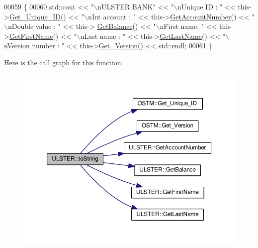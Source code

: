 \begin{DoxyCode}
00059 \{
00060    std::cout << \textcolor{stringliteral}{"\(\backslash\)nULSTER BANK"} << \textcolor{stringliteral}{"\(\backslash\)nUnique ID : "} << this->\hyperlink{class_o_s_t_m_a5a01a8b98d16b1d1904ecf9356e7b71d_a5a01a8b98d16b1d1904ecf9356e7b71d}{Get\_Unique\_ID}() << \textcolor{stringliteral}{"\(\backslash\)nInt account
       : "} << this->\hyperlink{class_u_l_s_t_e_r_a1ad672ae865a9f559bf4d3c33c243d63_a1ad672ae865a9f559bf4d3c33c243d63}{GetAccountNumber}() << \textcolor{stringliteral}{"\(\backslash\)nDouble value : "} << this->
      \hyperlink{class_u_l_s_t_e_r_ae70da9686ac038862900182a984e56eb_ae70da9686ac038862900182a984e56eb}{GetBalance}() << \textcolor{stringliteral}{"\(\backslash\)nFirst name: "} << this->\hyperlink{class_u_l_s_t_e_r_a85ee4e42d9b309608d8dfbedac65ff27_a85ee4e42d9b309608d8dfbedac65ff27}{GetFirstName}() << \textcolor{stringliteral}{"\(\backslash\)nLast name : "} << 
      this->\hyperlink{class_u_l_s_t_e_r_a9320b012bccda4ebf6b41c9ed972743c_a9320b012bccda4ebf6b41c9ed972743c}{GetLastName}()  << \textcolor{stringliteral}{"\(\backslash\)nVersion number : "} << this->\hyperlink{class_o_s_t_m_a1f1db9d482f22c8e7caa17dfb340626b_a1f1db9d482f22c8e7caa17dfb340626b}{Get\_Version}() << std::endl;
00061 \}
\end{DoxyCode}


Here is the call graph for this function\+:\nopagebreak
\begin{figure}[H]
\begin{center}
\leavevmode
\includegraphics[width=350pt]{class_u_l_s_t_e_r_a341bbcb3f7d6ef10f30d4734ceed10ee_a341bbcb3f7d6ef10f30d4734ceed10ee_cgraph}
\end{center}
\end{figure}




